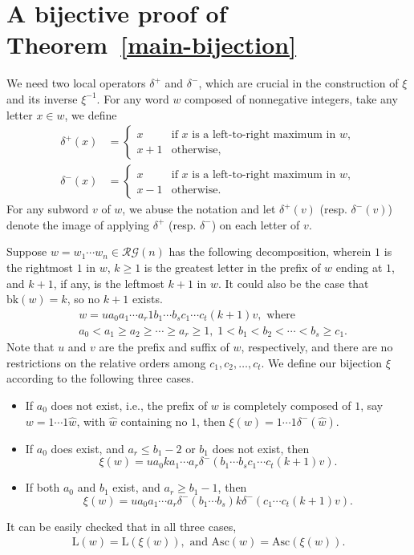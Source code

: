 \documentclass[12pt]{amsart}
\numberwithin{equation}{section}
\theoremstyle{plain}
\theoremstyle{definition}
\def\bk{\mathrm{bk}}
\def\Asc{\mathrm{Asc}}
\def\LL{\mathrm{L}}
\def\RG{\mathcal{RG}}
\begin{document}
\section{A bijective proof of Theorem~\ref{main-bijection}}\label{sec:involution}
We need two local operators $\delta^+$ and $\delta^-$, which are crucial in the construction of $\xi$ and its inverse $\xi^{-1}$. For any word $w$ composed of nonnegative integers, take any letter $x\in w$, we define
\begin{align*}
\delta^+(x) &=\begin{cases}
x & \text{if $x$ is a left-to-right maximum in $w$},\\
x+1 & \text{otherwise},
\end{cases}
\\
\delta^-(x) &=\begin{cases}
x & \text{if $x$ is a left-to-right maximum in $w$},\\
x-1 & \text{otherwise}.
\end{cases}
\end{align*}
For any subword $v$ of $w$, we abuse the notation and let $\delta^+(v)$ (resp. $\delta^-(v)$) denote the image of applying $\delta^+$ (resp. $\delta^-$) on each letter of $v$.

Suppose $w=w_1\cdots w_n\in \RG(n)$ has the following decomposition, wherein $1$ is the rightmost $1$ in $w$, $k\ge 1$ is the greatest letter in the prefix of $w$ ending at $1$, and $k+1$, if any, is the leftmost $k+1$ in $w$. It could also be the case that $\bk(w)=k$, so no $k+1$ exists.
\begin{align*}
& w=u a_0a_1\cdots a_r 1 b_1\cdots b_s c_1\cdots c_t (k+1)v, \text{ where}\\
& a_0<a_1\ge a_2\ge \cdots \ge a_r\ge 1, \; 1<b_1<b_2<\cdots<b_s\ge c_1.
\end{align*}
Note that $u$ and $v$ are the prefix and suffix of $w$, respectively, and there are no restrictions on the relative orders among $c_1, c_2,\ldots, c_t$. We define our bijection $\xi$ according to the following three cases.
\begin{itemize}
	\item[I.] If $a_0$ does not exist, i.e., the prefix of $w$ is completely composed of $1$, say $w=1\cdots 1\hat{w}$, with $\hat{w}$ containing no $1$, then $\xi(w)=1\cdots 1\delta^-(\hat{w})$.
	\item[II.] If $a_0$ does exist, and $a_r\le b_1-2$ or $b_1$ does not exist, then $$\xi(w)=ua_0ka_1\cdots a_r\delta^-(b_1\cdots b_s c_1\cdots c_t(k+1)v).$$
	\item[III.] If both $a_0$ and $b_1$ exist, and $a_r\ge b_1-1$, then $$\xi(w)=ua_0a_1\cdots a_r\delta^-(b_1\cdots b_s)k\delta^-(c_1 \cdots c_t(k+1)v).$$
\end{itemize}
It can be easily checked that in all three cases,
\begin{align}\label{L-Asc}
\LL(w) = \LL(\xi(w)),\text{ and } \Asc(w) = \Asc(\xi(w)).
\end{align}
\end{document}
